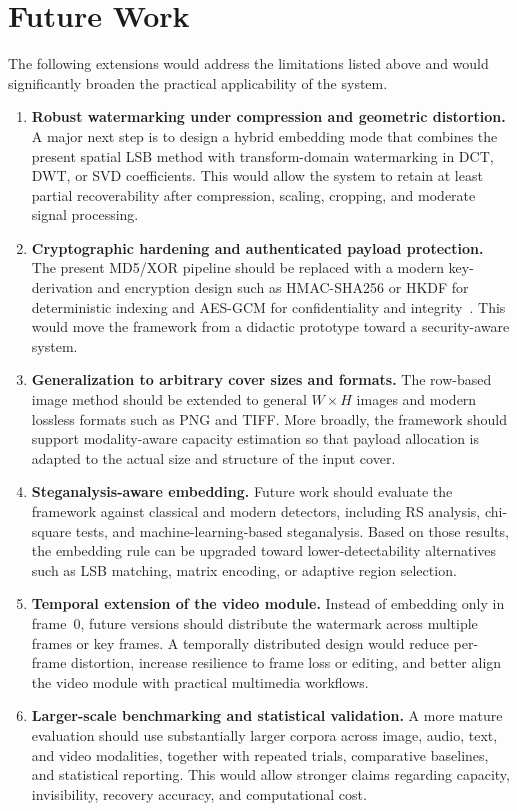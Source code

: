 \section{Future Work}

The following extensions would address the limitations listed above and would significantly broaden the practical applicability of the system.

\begin{enumerate}[label=\textbf{F\arabic*.}]
    \item \textbf{Robust watermarking under compression and geometric distortion.} A major next step is to design a hybrid embedding mode that combines the present spatial LSB method with transform-domain watermarking in DCT, DWT, or SVD coefficients. This would allow the system to retain at least partial recoverability after compression, scaling, cropping, and moderate signal processing.
    \item \textbf{Cryptographic hardening and authenticated payload protection.} The present MD5/XOR pipeline should be replaced with a modern key-derivation and encryption design such as HMAC-SHA256 or HKDF for deterministic indexing and AES-GCM for confidentiality and integrity~\cite{daemen2002design}. This would move the framework from a didactic prototype toward a security-aware system.
    \item \textbf{Generalization to arbitrary cover sizes and formats.} The row-based image method should be extended to general $W \times H$ images and modern lossless formats such as PNG and TIFF. More broadly, the framework should support modality-aware capacity estimation so that payload allocation is adapted to the actual size and structure of the input cover.
    \item \textbf{Steganalysis-aware embedding.} Future work should evaluate the framework against classical and modern detectors, including RS analysis, chi-square tests, and machine-learning-based steganalysis. Based on those results, the embedding rule can be upgraded toward lower-detectability alternatives such as LSB matching, matrix encoding, or adaptive region selection.
    \item \textbf{Temporal extension of the video module.} Instead of embedding only in frame~0, future versions should distribute the watermark across multiple frames or key frames. A temporally distributed design would reduce per-frame distortion, increase resilience to frame loss or editing, and better align the video module with practical multimedia workflows.
    \item \textbf{Larger-scale benchmarking and statistical validation.} A more mature evaluation should use substantially larger corpora across image, audio, text, and video modalities, together with repeated trials, comparative baselines, and statistical reporting. This would allow stronger claims regarding capacity, invisibility, recovery accuracy, and computational cost.

\end{enumerate}
